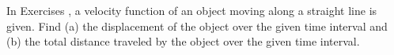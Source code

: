 {\noindent In Exercises}
{, a velocity function of an object moving along a straight line is given. Find (a) the displacement of the object over the given time interval and (b) the total distance traveled by the object over the given time interval.
}
